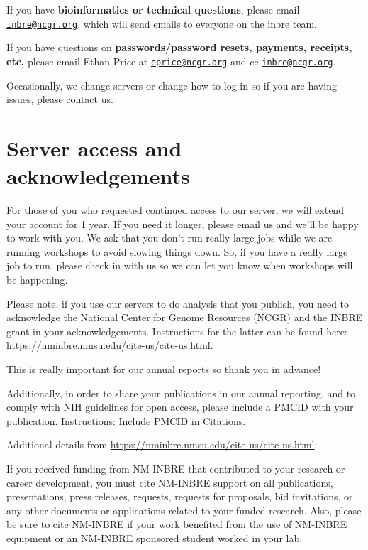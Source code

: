\documentclass[
]{book}
\begin{document}
If you have \textbf{bioinformatics or technical questions}, please email \href{mailto:inbre@ncgr.org}{\nolinkurl{inbre@ncgr.org}}, which will send emails to everyone on the inbre team.

If you have questions on \textbf{passwords/password resets, payments, receipts, etc,} please email Ethan Price at \href{mailto:eprice@ncgr.org}{\nolinkurl{eprice@ncgr.org}} and cc \href{mailto:inbre@ncgr.org}{\nolinkurl{inbre@ncgr.org}}.

Occasionally, we change servers or change how to log in so if you are having issues, please contact us.

\hypertarget{server-access-and-acknowledgements}{%
\section{Server access and acknowledgements}\label{server-access-and-acknowledgements}}

For those of you who requested continued access to our server, we will extend your account for 1 year. If you need it longer, please email us and we'll be happy to work with you. We ask that you don't run really large jobs while we are running workshops to avoid slowing things down. So, if you have a really large job to run, please check in with us so we can let you know when workshops will be happening.

Please note, if you use our servers to do analysis that you publish, you need to acknowledge the National Center for Genome Resources (NCGR) and the INBRE grant in your acknowledgements. Instructions for the latter can be found here: \url{https://nminbre.nmsu.edu/cite-us/cite-us.html}.

This is really important for our annual reports so thank you in advance!

Additionally, in order to share your publications in our annual reporting, and to comply with NIH guidelines for open access, please include a PMCID with your publication. Instructions: \href{https://publicaccess.nih.gov/include-pmcid-citations.htm}{Include PMCID in Citations}.

Additional details from \url{https://nminbre.nmsu.edu/cite-us/cite-us.html}:

{If you received funding from NM-INBRE that contributed to your research or career development, you must cite NM-INBRE support on all publications, presentations, press releases, requests, requests for proposals, bid invitations, or any other documents or applications related to your funded research. Also, please be sure to cite NM-INBRE if your work benefited from the use of NM-INBRE equipment or an NM-INBRE sponsored student worked in your lab.}
\end{document}
